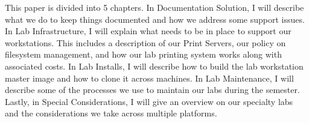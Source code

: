 This paper is divided into 5 chapters.  In Documentation Solution, I will describe what we do to keep things documented and how we address some support issues.  In Lab Infrastructure, I will explain what needs to be in place to support our workstations.  This includes a description of our Print Servers, our policy on filesystem management, and how our lab printing system works along with associated costs.  In Lab Installs, I will describe how to build the lab workstation master image and how to clone it across machines.  In Lab Maintenance, I will describe some of the processes we use to maintain our labs during the semester.  Lastly, in Special Considerations, I will give an overview on our specialty labs and the considerations we take across multiple platforms.  


